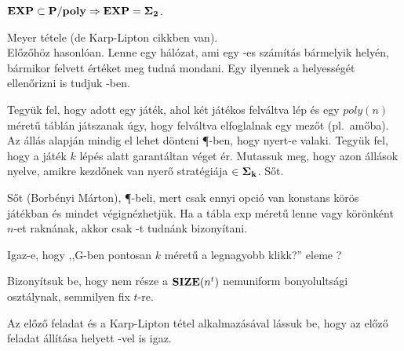 \begin{Exercise}[counter={sorszam}, difficulty=1]
	$\mbox{\ensuremath{\mathbf{EXP}}}\subset \mbox{\ensuremath{\mathbf{P/poly}}} \Rightarrow \mbox{\ensuremath{\mathbf{EXP}}}= \mbox{\ensuremath{\mathbf{\Sigma_2}}}$.
\end{Exercise}	
\begin{Answer}
	Meyer t\'etele (de Karp-Lipton cikkben van).\\
	El\H oz\H oh\"oz hasonl\'oan. Lenne egy hálózat, ami egy \EXP-es sz\'am\'it\'as b\'armelyik hely\'en, b\'armikor felvett \'ert\'eket meg tudn\'a mondani. Egy ilyennek a helyess\'eg\'et ellen\H orizni is tudjuk \coNP-ben.
\end{Answer}

\begin{Exercise}[counter={sorszam}, difficulty=0]
	Tegyük fel, hogy adott egy játék, ahol két játékos felváltva lép és egy $poly(n)$ méret\H u táblán játszanak \'ugy, hogy felv\'altva elfoglalnak egy mez\H ot (pl.\ am\H oba). Az állás alapján mindig el lehet dönteni \P-ben, hogy nyert-e valaki. Tegy\"uk fel, hogy a játék $k$ lépés alatt garant\'altan véget ér. Mutassuk meg, hogy azon \'all\'asok nyelve, amikre kezd\H onek van nyer\H o stratégiája $\in \mbox{\ensuremath{\mathbf{\Sigma_k}}}$. S\H ot.
\end{Exercise}	
\begin{Answer}
	S\H ot (Borb\'enyi M\'arton), \P-beli, mert csak ennyi opci\'o van konstans k\"or\"os j\'at\'ekban \'es mindet v\'egign\'ezhetj\"uk.
	Ha a t\'abla exp m\'eret\H u lenne vagy k\"or\"onk\'ent $n$-et rakn\'anak, akkor csak \Sigmak-t tudn\'ank bizony\'itani.	
\end{Answer}

\begin{Exercise}[counter={sorszam}, difficulty=0]
	Igaz-e, hogy ,,G-ben pontosan $k$ méretű a legnagyobb klikk?'' eleme \Sigmatwo?
\end{Exercise}

\begin{Exercise}[counter={sorszam}, difficulty=1]
	Bizonyítsuk be, hogy  nem része a $\mbox{\ensuremath{\mathbf{SIZE}}}(n^t)$ nemuniform bonyolultsági
	osztálynak, semmilyen fix $t$-re. 
	
\end{Exercise}

\begin{Exercise}[counter={sorszam}, difficulty=1]
	Az előző feladat és a Karp-Lipton tétel alkalmazásával lássuk be, hogy az
	előző feladat állítása  helyett \Sigmatwo-vel is igaz.
	
\end{Exercise}


